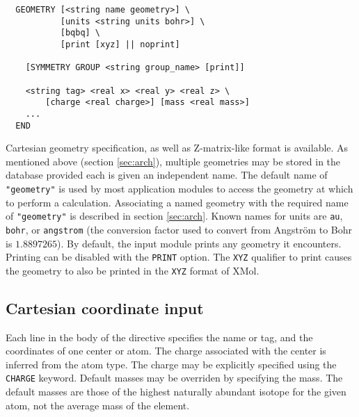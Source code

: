 \label{sec:geom}

\begin{verbatim}
  GEOMETRY [<string name geometry>] \
           [units <string units bohr>] \
           [bqbq] \
           [print [xyz] || noprint]
    
    [SYMMETRY GROUP <string group_name> [print]]

    <string tag> <real x> <real y> <real z> \
        [charge <real charge>] [mass <real mass>]
    ...
  END
\end{verbatim}

Cartesian geometry specification, as well as Z-matrix-like format is
available.  As mentioned above (section
\ref{sec:arch}), multiple geometries may be stored in the database
provided each is given an independent name.  The default name of
\verb+"geometry"+ is used by most application modules to access the
geometry at which to perform a calculation.  Associating a named
geometry with the required name of \verb+"geometry"+ is described in
section \ref{sec:arch}.  Known names for units are \verb+au+,
\verb+bohr+, or \verb+angstrom+ (the conversion factor used to convert
from Angstr\"{o}m to Bohr is $1.8897265$). By default, the input
module prints any geometry it encounters.  Printing can be disabled
with the \verb+PRINT+ option.  The \verb+XYZ+ qualifier to print
causes the geometry to also be printed in the \verb+XYZ+ format of
XMol.  

\subsection{Cartesian coordinate input}

Each line in the body of the directive specifies the name or tag, and
the coordinates of one center or atom.  The charge associated with the
center is inferred from the atom type.  The charge may be explicitly
specified using the \verb+CHARGE+ keyword.  Default masses may be
overriden by specifying the mass.  The default masses are those of the
highest naturally abundant isotope for the given atom, not the average
mass of the element.  

